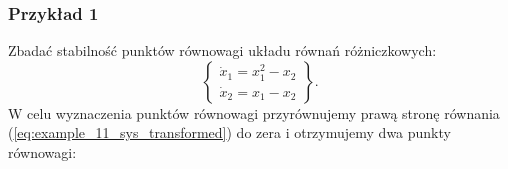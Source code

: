 \documentclass{article}
\begin{document}
        \subsubsection{Przykład 1}
        Zbadać stabilność punktów równowagi układu równań różniczkowych:
        \begin{equation}\label{eq:example_11_sys_transformed}
            \left\{
            \begin{array}{l}
                 \dot{x}_{1} = x_{1}^{2} - x_{2}\\
                 \dot{x}_{2} = x_{1} - x_{2}
            \end{array}
            \right\}.
        \end{equation}
        W celu wyznaczenia punktów równowagi przyrównujemy prawą stronę równania (\ref{eq:example_11_sys_transformed}) do zera i otrzymujemy dwa punkty równowagi:
\end{document}
